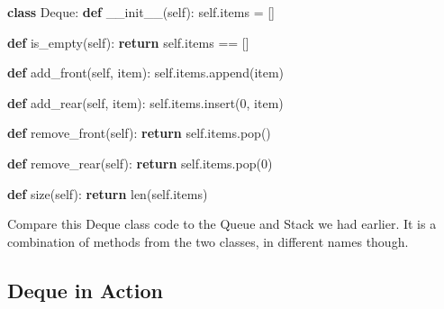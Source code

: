 \documentclass[
  letterpaper,
]{scrbook}
\newenvironment{Shaded}{\begin{snugshade}}{\end{snugshade}}
\newcommand{\BuiltInTok}[1]{\textcolor[rgb]{0.00,0.23,0.31}{#1}}
\newcommand{\ControlFlowTok}[1]{\textcolor[rgb]{0.00,0.23,0.31}{\textbf{#1}}}
\newcommand{\DecValTok}[1]{\textcolor[rgb]{0.68,0.00,0.00}{#1}}
\newcommand{\FunctionTok}[1]{\textcolor[rgb]{0.28,0.35,0.67}{#1}}
\newcommand{\KeywordTok}[1]{\textcolor[rgb]{0.00,0.23,0.31}{\textbf{#1}}}
\newcommand{\NormalTok}[1]{\textcolor[rgb]{0.00,0.23,0.31}{#1}}
\newcommand{\OperatorTok}[1]{\textcolor[rgb]{0.37,0.37,0.37}{#1}}
\newcommand{\VariableTok}[1]{\textcolor[rgb]{0.07,0.07,0.07}{#1}}
\begin{document}
\begin{Shaded}
\begin{Highlighting}[]
\KeywordTok{class}\NormalTok{ Deque: }
    \KeywordTok{def} \FunctionTok{\_\_init\_\_}\NormalTok{(}\VariableTok{self}\NormalTok{):}
        \VariableTok{self}\NormalTok{.items }\OperatorTok{=}\NormalTok{ []}
    
    \KeywordTok{def}\NormalTok{ is\_empty(}\VariableTok{self}\NormalTok{):}
        \ControlFlowTok{return} \VariableTok{self}\NormalTok{.items }\OperatorTok{==}\NormalTok{ []}
    
    \KeywordTok{def}\NormalTok{ add\_front(}\VariableTok{self}\NormalTok{, item): }
        \VariableTok{self}\NormalTok{.items.append(item)}
    
    \KeywordTok{def}\NormalTok{ add\_rear(}\VariableTok{self}\NormalTok{, item):}
        \VariableTok{self}\NormalTok{.items.insert(}\DecValTok{0}\NormalTok{, item)}
        
    \KeywordTok{def}\NormalTok{ remove\_front(}\VariableTok{self}\NormalTok{):}
        \ControlFlowTok{return} \VariableTok{self}\NormalTok{.items.pop()}
    
    \KeywordTok{def}\NormalTok{ remove\_rear(}\VariableTok{self}\NormalTok{):}
        \ControlFlowTok{return} \VariableTok{self}\NormalTok{.items.pop(}\DecValTok{0}\NormalTok{)}
    
    \KeywordTok{def}\NormalTok{ size(}\VariableTok{self}\NormalTok{):}
        \ControlFlowTok{return} \BuiltInTok{len}\NormalTok{(}\VariableTok{self}\NormalTok{.items)}
\end{Highlighting}
\end{Shaded}

Compare this Deque class code to the Queue and Stack we had earlier. It
is a combination of methods from the two classes, in different names
though.

\subsection*{Deque in Action}\label{deque-in-action}
\end{document}
